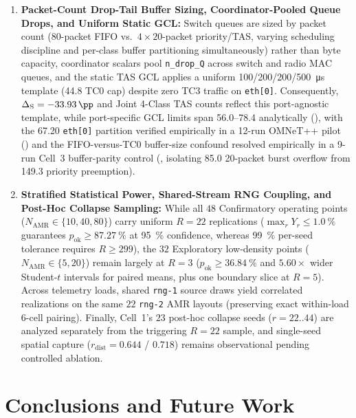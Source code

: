 \documentclass[11pt,a4paper]{article}
\newcommand{\Namr}{\ensuremath{N_{\mathrm{AMR}}}}
\newcommand{\rdist}{\ensuremath{r_{\mathrm{dist}}}}
\newcommand{\GainS}{\ensuremath{\Delta_{\mathrm{S}}}}
\begin{document}
\begin{enumerate}[leftmargin=2.0em]
    \item \textbf{Packet-Count Drop-Tail Buffer Sizing, Coordinator-Pooled Queue Drops, and Uniform Static GCL:} Switch queues are sized by packet count (80-packet FIFO vs.\ $4 \times 20$-packet priority/TAS, varying scheduling discipline and per-class buffer partitioning simultaneously) rather than byte capacity, coordinator scalars pool \texttt{n\_drop\_Q} across switch and radio MAC queues, and the static TAS GCL applies a uniform \qty{100}{}/\qty{200}{}/\qty{200}{}/\qty{500}{\micro\second} template (\qty{44.8}{\mbps} TC0 cap) despite zero TC3 traffic on \texttt{eth[0]}. Consequently, $\GainS = \qty{-33.93}{\pp}$ and Joint 4-Class TAS counts reflect this port-agnostic template, while port-specific GCL limits span \qtyrange{56.0}{78.4}{\mbps} analytically (), with the \qty{67.20}{\mbps} \texttt{eth[0]} partition verified empirically in a 12-run OMNeT++ pilot () and the FIFO-versus-TC0 buffer-size confound resolved empirically in a 9-run Cell~3 buffer-parity control (, isolating \qty{85.0}{\mbps} 20-packet burst overflow from \qty{149.3}{\mbps} priority preemption).
    \item \textbf{Stratified Statistical Power, Shared-Stream RNG Coupling, and Post-Hoc Collapse Sampling:} While all $48$ Confirmatory operating points ($\Namr \in \{10, 40, 80\}$) carry uniform $R=22$ replications ($\max_{r} Y_r \le \qty{1.0}{\percent}$ guarantees $p_{\mathrm{ok}} \ge \qty{87.27}{\percent}$ at \qty{95}{\percent} confidence, whereas \qty{99}{\percent} per-seed tolerance requires $R \ge 299$), the $32$ Exploratory low-density points ($\Namr \in \{5, 20\}$) remain largely at $R=3$ ($p_{\mathrm{ok}} \ge \qty{36.84}{\percent}$ and $5.60\times$ wider Student-$t$ intervals for paired means, plus one boundary slice at $R=5$). Across telemetry loads, shared \texttt{rng-1} source draws yield correlated realizations on the same $22$ \texttt{rng-2} AMR layouts (preserving exact within-load 6-cell pairing). Finally, Cell~1's $23$ post-hoc collapse seeds ($r=22..44$) are analyzed separately from the triggering $R=22$ sample, and single-seed spatial capture ($\rdist = 0.644$ / $0.718$) remains observational pending controlled ablation.
\end{enumerate}

\section{Conclusions and Future Work}
\label{sec:conclusion}
\end{document}

